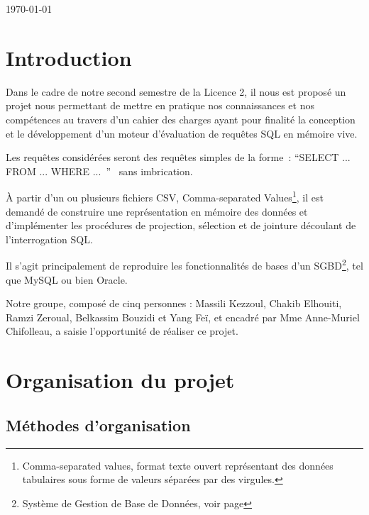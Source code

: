 \documentclass[oneside,13pt,a4paper]{report}
\begin{document}
\begin{titlepage}
	\par\vspace{1cm}

	\vfill

	{\large \today\par}
\end{titlepage}


\tableofcontents

\parskip=5pt


\chapter{Introduction}

Dans le cadre de notre second semestre de la Licence 2,
il nous est proposé un projet nous permettant de mettre en pratique nos connaissances et nos compétences
au travers d’un cahier des charges ayant pour finalité la conception et le développement d’un moteur d’évaluation de requêtes SQL en mémoire vive.

Les requêtes considérées seront des requêtes simples de la forme : \enquote{SELECT ... FROM ... WHERE ... }  sans imbrication.

À partir d’un ou plusieurs fichiers CSV, Comma-separated Values\footnote{Comma-separated values, format texte ouvert représentant des données tabulaires sous forme de valeurs séparées par des virgules.},
il est demandé de construire une représentation en mémoire des données et d’implémenter les procédures de projection,
sélection et de jointure découlant de l’interrogation SQL.

Il s’agit principalement de reproduire les fonctionnalités de bases d’un SGBD\footnote{Système de Gestion de Base de Données, voir page \pageref{sgbd}}, tel que MySQL ou bien Oracle.

Notre groupe, composé de cinq personnes : Massili Kezzoul, Chakib Elhouiti, Ramzi Zeroual, Belkassim Bouzidi et Yang Feï, et encadré par Mme Anne-Muriel Chifolleau,
a saisie l'opportunité de réaliser ce projet.

\chapter{Organisation du projet}
\section{Méthodes d’organisation}
\end{document}
